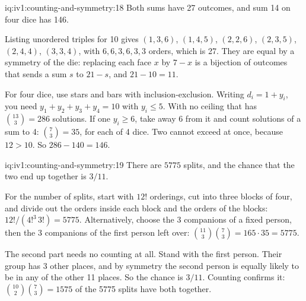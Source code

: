 \begin{solution}{iq:iv1:counting-and-symmetry:18}
Both sums have 27 outcomes, and sum 14 on four dice has 146.

Listing unordered triples for 10 gives $(1,3,6)$, $(1,4,5)$, $(2,2,6)$, $(2,3,5)$, $(2,4,4)$, $(3,3,4)$, with $6, 6, 3, 6, 3, 3$ orders, which is 27. They are equal by a symmetry of the die: replacing each face $x$ by $7 - x$ is a bijection of outcomes that sends a sum $s$ to $21 - s$, and $21 - 10 = 11$.

For four dice, use stars and bars with inclusion-exclusion. Writing $d_i = 1 + y_i$, you need $y_1 + y_2 + y_3 + y_4 = 10$ with $y_i \le 5$. With no ceiling that has $\binom{13}{3} = 286$ solutions. If one $y_i \ge 6$, take away 6 from it and count solutions of a sum to 4: $\binom{7}{3} = 35$, for each of 4 dice. Two cannot exceed at once, because $12 > 10$. So $286 - 140 = 146$.

\end{solution}

\begin{solution}{iq:iv1:counting-and-symmetry:19}
There are $5775$ splits, and the chance that the two end up together is $3/11$.

For the number of splits, start with $12!$ orderings, cut into three blocks of four, and divide out the orders inside each block and the orders of the blocks: $12!/(4!^3\,3!) = 5775$. Alternatively, choose the 3 companions of a fixed person, then the 3 companions of the first person left over: $\binom{11}{3}\binom{7}{3} = 165 \cdot 35 = 5775$.

The second part needs no counting at all. Stand with the first person. Their group has 3 other places, and by symmetry the second person is equally likely to be in any of the other 11 places. So the chance is $3/11$. Counting confirms it: $\binom{10}{2}\binom{7}{3} = 1575$ of the 5775 splits have both together.

\end{solution}

